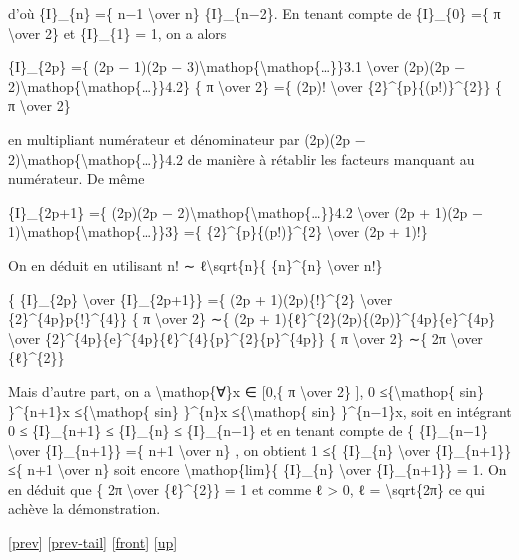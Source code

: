 \documentclass[]{article}
\begin{document}
d'où \{I\}\_\{n\} =\{ n−1 \textbackslash{}over n\} \{I\}\_\{n−2\}. En
tenant compte de \{I\}\_\{0\} =\{ π \textbackslash{}over 2\} et
\{I\}\_\{1\} = 1, on a alors

\{I\}\_\{2p\} =\{ (2p − 1)(2p −
3)\textbackslash{}mathop\{\textbackslash{}mathop\{\ldots{}\}\}3.1
\textbackslash{}over (2p)(2p −
2)\textbackslash{}mathop\{\textbackslash{}mathop\{\ldots{}\}\}4.2\} \{ π
\textbackslash{}over 2\} =\{ (2p)! \textbackslash{}over
\{2\}\^{}\{p\}\{(p!)\}\^{}\{2\}\} \{ π \textbackslash{}over 2\}

en multipliant numérateur et dénominateur par (2p)(2p −
2)\textbackslash{}mathop\{\textbackslash{}mathop\{\ldots{}\}\}4.2 de
manière à rétablir les facteurs manquant au numérateur. De même

\{I\}\_\{2p+1\} =\{ (2p)(2p −
2)\textbackslash{}mathop\{\textbackslash{}mathop\{\ldots{}\}\}4.2
\textbackslash{}over (2p + 1)(2p −
1)\textbackslash{}mathop\{\textbackslash{}mathop\{\ldots{}\}\}3\} =\{
\{2\}\^{}\{p\}\{(p!)\}\^{}\{2\} \textbackslash{}over (2p + 1)!\}

On en déduit en utilisant n! ∼ ℓ\textbackslash{}sqrt\{n\}\{
\{n\}\^{}\{n\} \textbackslash{}over n!\}

\{ \{I\}\_\{2p\} \textbackslash{}over \{I\}\_\{2p+1\}\} =\{ (2p +
1)(2p)\{!\}\^{}\{2\} \textbackslash{}over
\{2\}\^{}\{4p\}p\{!\}\^{}\{4\}\} \{ π \textbackslash{}over 2\} ∼\{ (2p +
1)\{ℓ\}\^{}\{2\}(2p)\{(2p)\}\^{}\{4p\}\{e\}\^{}\{4p\}
\textbackslash{}over
\{2\}\^{}\{4p\}\{e\}\^{}\{4p\}\{ℓ\}\^{}\{4\}\{p\}\^{}\{2\}\{p\}\^{}\{4p\}\}
\{ π \textbackslash{}over 2\} ∼\{ 2π \textbackslash{}over
\{ℓ\}\^{}\{2\}\}

Mais d'autre part, on a \textbackslash{}mathop\{∀\}x ∈ {[}0,\{ π
\textbackslash{}over 2\} {]}, 0 ≤\{\textbackslash{}mathop\{ sin\}
\}\^{}\{n+1\}x ≤\{\textbackslash{}mathop\{ sin\} \}\^{}\{n\}x
≤\{\textbackslash{}mathop\{ sin\} \}\^{}\{n−1\}x, soit en intégrant 0 ≤
\{I\}\_\{n+1\} ≤ \{I\}\_\{n\} ≤ \{I\}\_\{n−1\} et en tenant compte de \{
\{I\}\_\{n−1\} \textbackslash{}over \{I\}\_\{n+1\}\} =\{ n+1
\textbackslash{}over n\} , on obtient 1 ≤\{ \{I\}\_\{n\}
\textbackslash{}over \{I\}\_\{n+1\}\} ≤\{ n+1 \textbackslash{}over n\}
soit encore \textbackslash{}mathop\{lim\}\{ \{I\}\_\{n\}
\textbackslash{}over \{I\}\_\{n+1\}\} = 1. On en déduit que \{ 2π
\textbackslash{}over \{ℓ\}\^{}\{2\}\} = 1 et comme ℓ \textgreater{} 0, ℓ
= \textbackslash{}sqrt\{2π\} ce qui achève la démonstration.

{[}\href{coursse42.html}{prev}{]}
{[}\href{coursse42.html\#tailcoursse42.html}{prev-tail}{]}
{[}\href{coursse43.html}{front}{]}
{[}\href{coursch8.html\#coursse43.html}{up}{]}
\end{document}

